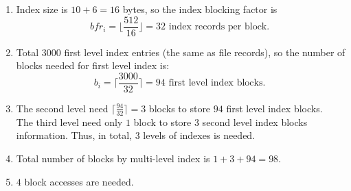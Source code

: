 \begin{homeworkProblem}
\begin{homeworkSubProblem}
    \begin{enumerate}[label=(\roman*)]
        \item Index size is $10+6=16$ bytes, so the index blocking factor is
            \[bfr_i = \bigg\lfloor\frac{512}{16}\bigg\rfloor = 32
            \text{ index records per block. }\]
        \item Total $3000$ first level index entries (the same as file records),
            so the number of blocks needed for first level index is:
            \[b_i = \bigg\lceil\frac{3000}{32}\bigg\rceil = 94 \text{ first level index blocks. }\]
        \item The second level need $\displaystyle\bigg\lceil\frac{94}{32}\bigg\rceil = 3$
            blocks to store $94$ first level index blocks.\\
            The third level need only $1$ block to store $3$ second level
            index blocks information. Thus, in total, $3$ levels of indexes
            is needed.
        \item Total number of blocks by multi-level index is $1 + 3 + 94 = 98$.
        \item $4$ block accesses are needed.
    \end{enumerate}
\end{homeworkSubProblem}


\end{homeworkProblem}
